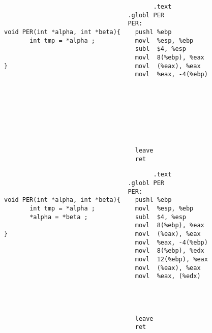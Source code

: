\begin{frame}[fragile]
\begin{verbatim}
                                         .text                   
                                  .globl PER                    
                                  PER:                      
void PER(int *alpha, int *beta){    pushl %ebp              
       int tmp = *alpha ;           movl  %esp, %ebp      
                                    subl  $4, %esp      
                                    movl  8(%ebp), %eax   
}                                   movl  (%eax), %eax      
                                    movl  %eax, -4(%ebp)    
                             
                             
                                 
                             
                                 
                                
                              
                                                        
                                    leave                            
                                    ret                 
\end{verbatim}
\end{frame}
\begin{frame}[fragile]
\begin{verbatim}
                                         .text          
                                  .globl PER            
                                  PER:                     
void PER(int *alpha, int *beta){    pushl %ebp             
       int tmp = *alpha ;           movl  %esp, %ebp     
       *alpha = *beta ;             subl  $4, %esp      
                                    movl  8(%ebp), %eax  
}                                   movl  (%eax), %eax     
                                    movl  %eax, -4(%ebp)   
                                    movl  8(%ebp), %edx 
                                    movl  12(%ebp), %eax
                                    movl  (%eax), %eax     
                                    movl  %eax, (%edx)  
                                 
                                
                              
                                                        
                                    leave                           
                                    ret                 
\end{verbatim}
\end{frame}
